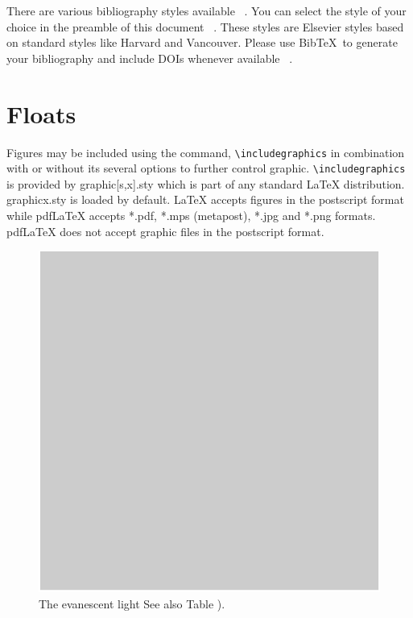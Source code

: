 \documentclass[a4paper,fleqn]{cas-dc}
\begin{document}
There are various bibliography styles available ~\citep{Fortunato2010}. You can select the
style of your choice in the preamble of this document ~\citep{Fortunato2010,NewmanGirvan2004}. These styles are
Elsevier styles based on standard styles like Harvard and Vancouver.
Please use Bib\TeX\ to generate your bibliography and include DOIs
whenever available ~\citep{Fortunato2010,Vehlowetal2013}.

\section{Floats}

{Figures} may be included using the command,\linebreak 
\verb+\includegraphics+ in
combination with or without its several options to further control
graphic. \verb+\includegraphics+ is provided by {graphic[s,x].sty}
which is part of any standard \LaTeX{} distribution.
{graphicx.sty} is loaded by default. \LaTeX{} accepts figures in
the postscript format while pdf\LaTeX{} accepts {*.pdf},
{*.mps} (metapost), {*.jpg} and {*.png} formats. 
pdf\LaTeX{} does not accept graphic files in the postscript format. 

\begin{figure}
	\centering
		\includegraphics[scale=.75]{figs/Fig1.pdf}
	\caption{The evanescent light See also Table ).}
	\label{FIG:1}
\end{figure}
\end{document}
